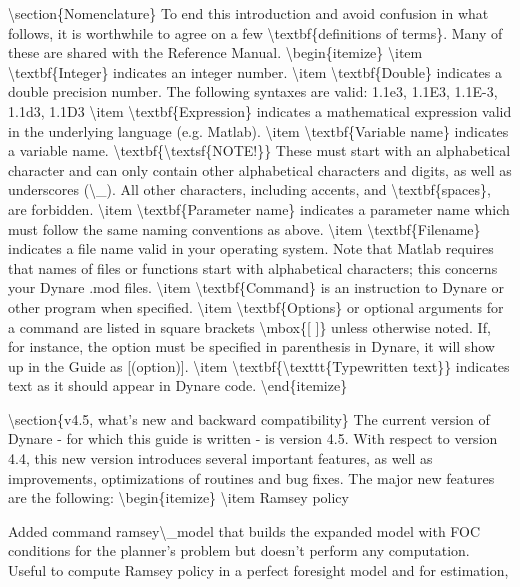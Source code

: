 \documentclass[10pt,math=newtx,citestyle=gb7714-2015,bibstyle=gb7714-2015]{elegantbook}
\begin{document}
	\textbackslash{}section\{Nomenclature\}
	To end this introduction and avoid confusion in what follows, it is worthwhile to agree on a few \textbackslash{}textbf\{definitions of terms\}. Many of these are shared with the Reference Manual.
	\textbackslash{}begin\{itemize\}
	\textbackslash{}item \textbackslash{}textbf\{Integer\} indicates an integer number.
	\textbackslash{}item \textbackslash{}textbf\{Double\} indicates a double precision number. The following syntaxes are valid: 1.1e3, 1.1E3, 1.1E-3, 1.1d3, 1.1D3
	\textbackslash{}item \textbackslash{}textbf\{Expression\} indicates a mathematical expression valid in the underlying language (e.g. Matlab).
	\textbackslash{}item \textbackslash{}textbf\{Variable name\} indicates a variable name. \textbackslash{}textbf\{\textbackslash{}textsf\{NOTE!\}\} These must start with an alphabetical character and can only contain other alphabetical characters and digits, as well as underscores (\textbackslash{}\_). All other characters, including accents, and \textbackslash{}textbf\{spaces\}, are forbidden.
	\textbackslash{}item \textbackslash{}textbf\{Parameter name\} indicates a parameter name which must follow the same naming conventions as above.
	\textbackslash{}item \textbackslash{}textbf\{Filename\} indicates a file name valid in your operating system. Note that Matlab requires that names of files or functions start with alphabetical characters; this concerns your Dynare .mod files.
	\textbackslash{}item \textbackslash{}textbf\{Command\} is an instruction to Dynare or other program when specified.
	\textbackslash{}item \textbackslash{}textbf\{Options\} or optional arguments for a command are listed in square brackets \textbackslash{}mbox\{[ ]\} unless otherwise noted. If, for instance, the option must be specified in parenthesis in Dynare, it will show up in the Guide as [(option)].
	\textbackslash{}item \textbackslash{}textbf\{\textbackslash{}texttt\{Typewritten text\}\} indicates text as it should appear in Dynare code.
	\textbackslash{}end\{itemize\}
	
	\textbackslash{}section\{v4.5, what's new and backward compatibility\}
	The current version of Dynare - for which this guide is written - is version 4.5. With respect to version 4.4, this new version introduces several important features, as well as improvements, optimizations of routines and bug fixes. The major new features are the following:
	\textbackslash{}begin\{itemize\}
	\textbackslash{}item Ramsey policy
	
	
	Added command ramsey\textbackslash{}\_model that builds the expanded model with FOC conditions for the planner's problem but doesn't perform any computation. Useful to compute Ramsey policy in a perfect foresight model and for estimation,
	
\end{document}

